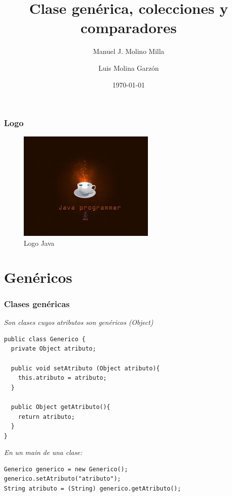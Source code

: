 \documentclass{beamer}
\title{Clase genérica, colecciones y comparadores}
\author{Manuel J. Molino Milla \and Luis Molina Garzón}
\date{\today} %
\institute{IES Virgen del Carmen \and Departamento de Informática}
\begin{document}
\begin{frame}
  \titlepage
\end{frame}

\begin{frame}
    \frametitle{Logo}
\begin{figure}
\includegraphics[scale=1]{imagenes/logo.jpeg} 
\caption{Logo Java}
\end{figure}
\end{frame}






\section{Genéricos} 
\begin{frame}[fragile]
\frametitle{Clases genéricas}
\emph{Son clases cuyos atributos son genéricos (Object)
}
\begin{verbatim}
public class Generico {
  private Object atributo;
  
  public void setAtributo (Object atributo){
    this.atributo = atributo;  
  }
  
  public Object getAtributo(){
    return atributo;
  }
}
\end{verbatim}
\pause
\emph{En un main de una clase:}
\begin{verbatim}
Generico generico = new Generico();
generico.setAtributo("atributo");
String atributo = (String) generico.getAtributo();
\end{verbatim}

\end{frame}
\end{document}
